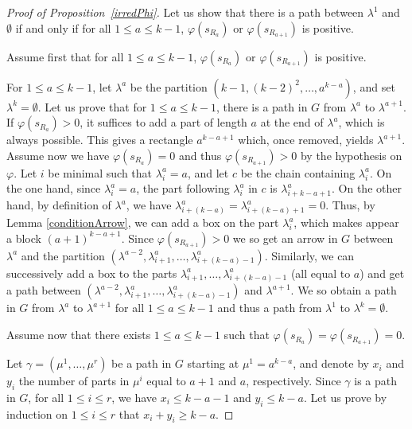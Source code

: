 \documentclass[ALCO,ThmDefs,Unicode,epreuves]{cedram}
\begin{document}
\begin{proof}
[Proof of Proposition~\ref{irredPhi}]Let us show that there is a path between
$\lambda^{1}$ and $\emptyset$ if and only if for all $1\leq a\leq k-1$,
$\varphi(s_{R_{a}})$ or $\varphi(s_{R_{a+1}})$ is positive.

Assume first that for all $1\leq a\leq k-1$, $\varphi(s_{R_{a}})$ or
$\varphi(s_{R_{a+1}})$ is positive.

\noindent For $1\leq a\leq k-1$, let $\lambda^{a}$ be the partition
$(k-1,(k-2)^{2},\ldots,a^{k-a})$, and set $\lambda^{k}=\emptyset$. Let us
prove that for $1\leq a\leq k-1$, there is a path in $G$ from $\lambda^{a}$ to
$\lambda^{a+1}$. If $\varphi(s_{R_{a}})>0$, it suffices to add a part of
length $a$ at the end of $\lambda^{a}$, which is always possible. This gives a
rectangle $a^{k-a+1}$ which, once removed, yields $\lambda^{a+1}$. Assume now
we have $\varphi(s_{R_{a}})=0$ and thus $\varphi(s_{R_{a+1}})>0$ by the
hypothesis on $\varphi$. Let $i$ be minimal such that $\lambda_{i}^{a}=a$, and
let $c$ be the chain containing $\lambda_{i}^{a}$. On the one hand, since
$\lambda_{i}^{a}=a$, the part following $\lambda_{i}^{a}$ in $c$ is
$\lambda_{i+k-a+1}^{a}$. On the other hand, by definition of $\lambda^{a}$, we
have $\lambda_{i+(k-a)}^{a}=\lambda_{i+(k-a)+1}^{a}=0$. Thus, by Lemma
\ref{conditionArrow}, we can add a box on the part $\lambda_{i}^{a}$, which
makes appear a block $(a+1)^{k-a+1}$. Since $\varphi(s_{R_{a+1}})>0$ we so get
an arrow in $G$ between $\lambda^{a}$ and the partition $(\lambda
^{a-2},\lambda_{i+1}^{a},\ldots,\lambda_{i+(k-a)-1}^{a})$. Similarly, we can
successively add a box to the parts $\lambda_{i+1}^{a},\ldots,\lambda
_{i+(k-a)-1}^{a}$ (all equal to $a$) and get a path between $(\lambda
^{a-2},\lambda_{i+1}^{a},\ldots,\lambda_{i+(k-a)-1}^{a})$ and $\lambda^{a+1}$.
We so obtain a path in $G$ from $\lambda^{a}$ to $\lambda^{a+1}$ for all
$1\leq a\leq k-1$ and thus a path from $\lambda^{1}$ to $\lambda^{k}%
=\emptyset$.

Assume now that there exists $1\leq a\leq k-1$ such that $\varphi(s_{R_{a}%
})=\varphi(s_{R_{a+1}})=0$.

\noindent
Let $\gamma=(\mu^{1},\ldots,\mu^{r})$ be a path in $G$ starting at
$\mu^{1}=a^{k-a}$, and denote by $x_{i}$ and $y_{i}$ the number of parts in
$\mu^{i}$ equal to $a+1$ and $a$, respectively. Since $\gamma$ is a path in
$G$, for all $1\leq i\leq r$, we have $x_{i}\leq k-a-1$ and $y_{i}\leq k-a$.
Let us prove by induction on $1\leq i\leq r$ that $x_{i}+y_{i}\geq k-a$.


\end{proof}
\end{document}
